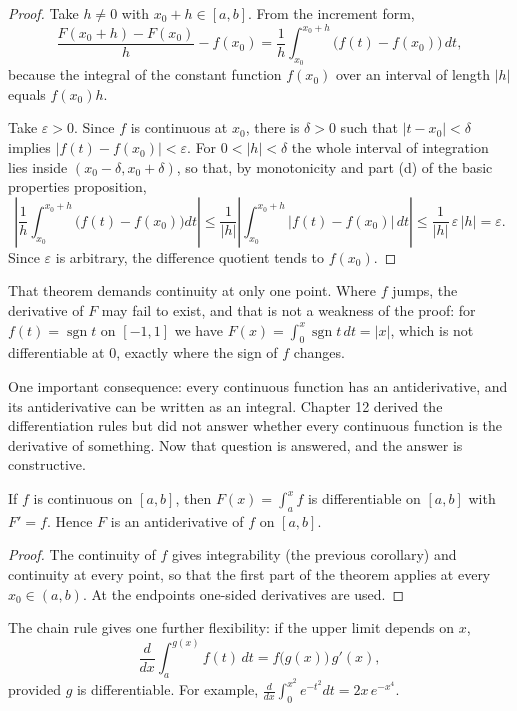 \begin{proof}
Take $h\ne0$ with $x_0+h\in[a,b]$. From the increment form,
\[
\frac{F(x_0+h)-F(x_0)}{h}-f(x_0)
=\frac{1}{h}\int_{x_0}^{x_0+h}\bigl(f(t)-f(x_0)\bigr)\,dt ,
\]
because the integral of the constant function $f(x_0)$ over an interval of length $|h|$ equals
$f(x_0)h$.

Take $\varepsilon>0$. Since $f$ is continuous at $x_0$, there is $\delta>0$ such that
$|t-x_0|<\delta$ implies $|f(t)-f(x_0)|<\varepsilon$. For $0<|h|<\delta$ the whole
interval of integration lies inside $(x_0-\delta,x_0+\delta)$, so that, by monotonicity
and part (d) of the basic properties proposition,
\[
\left|\frac{1}{h}\int_{x_0}^{x_0+h}\bigl(f(t)-f(x_0)\bigr)dt\right|
\le\frac{1}{|h|}\left|\int_{x_0}^{x_0+h}\bigl|f(t)-f(x_0)\bigr|\,dt\right|
\le\frac{1}{|h|}\,\varepsilon\,|h|=\varepsilon .
\]
Since $\varepsilon$ is arbitrary, the difference quotient tends to $f(x_0)$.
\end{proof}

That theorem demands continuity at only one point. Where $f$ jumps, the derivative of
$F$ may fail to exist, and that is not a weakness of the proof: for $f(t)=\operatorname{sgn} t$
on $[-1,1]$ we have $F(x)=\int_0^x\operatorname{sgn} t\,dt=|x|$, which is not
differentiable at $0$, exactly where the sign of $f$ changes.

One important consequence: every continuous function has an antiderivative, and its antiderivative can be
written as an integral. Chapter 12 derived the differentiation rules but did not answer whether
every continuous function is the derivative of something. Now that question is answered,
and the answer is constructive.

\begin{akibat}
If $f$ is continuous on $[a,b]$, then $F(x)=\int_a^x f$ is differentiable on $[a,b]$
with $F'=f$. Hence $F$ is an antiderivative of $f$ on $[a,b]$.
\end{akibat}

\begin{proof}
The continuity of $f$ gives integrability (the previous corollary) and continuity at every
point, so that the first part of the theorem applies at every $x_0\in(a,b)$. At the endpoints
one-sided derivatives are used.
\end{proof}

The chain rule gives one further flexibility: if the upper limit depends on $x$,
\[
\frac{d}{dx}\int_a^{g(x)}f(t)\,dt=f\bigl(g(x)\bigr)\,g'(x),
\]
provided $g$ is differentiable. For example,
$\frac{d}{dx}\int_0^{x^2}e^{-t^2}dt=2x\,e^{-x^4}$.

